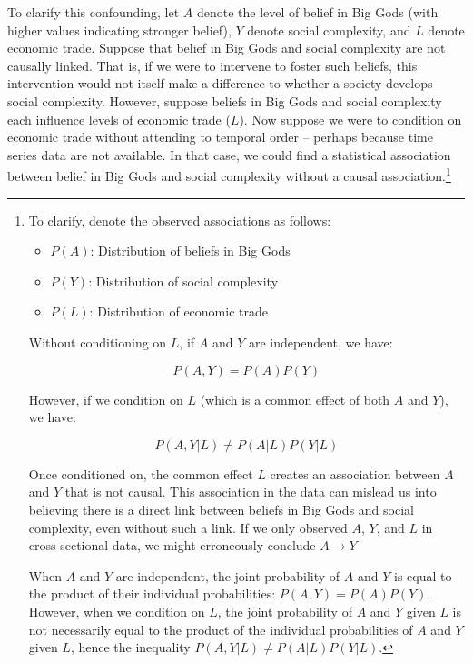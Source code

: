 \documentclass[
  singlecolumn]{article}
\providecommand{\tightlist}{%
  \setlength{\itemsep}{0pt}\setlength{\parskip}{0pt}}\usepackage{longtable,booktabs,array}
\begin{document}
To clarify this confounding, let \(A\) denote the level of belief in Big
Gods (with higher values indicating stronger belief), \(Y\) denote
social complexity, and \(L\) denote economic trade. Suppose that belief
in Big Gods and social complexity are not causally linked. That is, if
we were to intervene to foster such beliefs, this intervention would not
itself make a difference to whether a society develops social
complexity. However, suppose beliefs in Big Gods and social complexity
each influence levels of economic trade (\(L\)). Now suppose we were to
condition on economic trade without attending to temporal order --
perhaps because time series data are not available. In that case, we
could find a statistical association between belief in Big Gods and
social complexity without a causal association.\footnote{To clarify,
  denote the observed associations as follows:

  \begin{itemize}
  \tightlist
  \item
    \(P(A)\): Distribution of beliefs in Big Gods
  \item
    \(P(Y)\): Distribution of social complexity
  \item
    \(P(L)\): Distribution of economic trade
  \end{itemize}

  Without conditioning on \(L\), if \(A\) and \(Y\) are independent, we
  have:

  \[P(A, Y) = P(A)P(Y)\]

  However, if we condition on \(L\) (which is a common effect of both
  \(A\) and \(Y\)), we have:

  \[P(A, Y | L) \neq P(A | L)P(Y | L)\]

  Once conditioned on, the common effect \(L\) creates an association
  between \(A\) and \(Y\) that is not causal. This association in the
  data can mislead us into believing there is a direct link between
  beliefs in Big Gods and social complexity, even without such a link.
  If we only observed \(A\), \(Y\), and \(L\) in cross-sectional data,
  we might erroneously conclude \(A \to Y\)

  When \(A\) and \(Y\) are independent, the joint probability of \(A\)
  and \(Y\) is equal to the product of their individual probabilities:
  \(P(A, Y) = P(A)P(Y)\). However, when we condition on \(L\), the joint
  probability of \(A\) and \(Y\) given \(L\) is not necessarily equal to
  the product of the individual probabilities of \(A\) and \(Y\) given
  \(L\), hence the inequality \(P(A, Y | L) \neq P(A | L)P(Y | L)\).}
\end{document}
